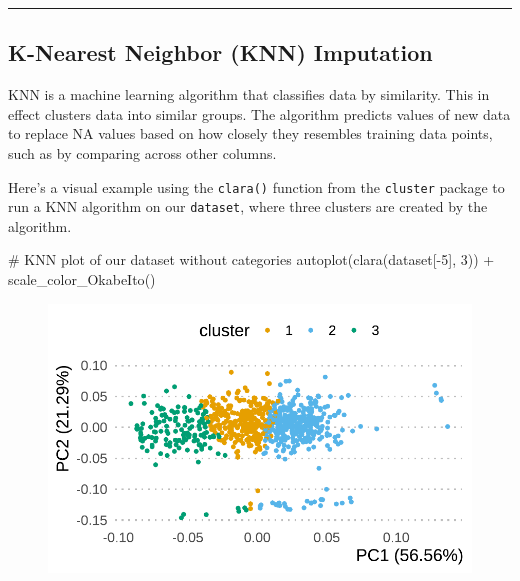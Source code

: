 \documentclass[
  letterpaper,
  DIV=11,
  numbers=noendperiod]{scrreprt}
\newenvironment{Shaded}{\begin{snugshade}}{\end{snugshade}}
\newcommand{\CommentTok}[1]{\textcolor[rgb]{0.37,0.37,0.37}{#1}}
\newcommand{\DecValTok}[1]{\textcolor[rgb]{0.68,0.00,0.00}{#1}}
\newcommand{\FunctionTok}[1]{\textcolor[rgb]{0.28,0.35,0.67}{#1}}
\newcommand{\NormalTok}[1]{\textcolor[rgb]{0.00,0.23,0.31}{#1}}
\newcommand{\SpecialCharTok}[1]{\textcolor[rgb]{0.37,0.37,0.37}{#1}}
\begin{document}
\begin{center}\rule{0.5\linewidth}{0.5pt}\end{center}

\hypertarget{k-nearest-neighbor-knn-imputation}{%
\subsection{K-Nearest Neighbor (KNN)
Imputation}\label{k-nearest-neighbor-knn-imputation}}

KNN is a machine learning algorithm that classifies data by similarity.
This in effect clusters data into similar groups. The algorithm predicts
values of new data to replace NA values based on how closely they
resembles training data points, such as by comparing across other
columns.

Here's a visual example using the \texttt{clara()} function from the
\texttt{cluster} package to run a KNN algorithm on our \texttt{dataset},
where three clusters are created by the algorithm.

\begin{Shaded}
\begin{Highlighting}[]
\CommentTok{\# KNN plot of our dataset without categories}
\FunctionTok{autoplot}\NormalTok{(}\FunctionTok{clara}\NormalTok{(dataset[}\SpecialCharTok{{-}}\DecValTok{5}\NormalTok{], }\DecValTok{3}\NormalTok{)) }\SpecialCharTok{+}
  \FunctionTok{scale\_color\_OkabeIto}\NormalTok{()}
\end{Highlighting}
\end{Shaded}

\begin{figure}[H]

{\centering \includegraphics{./ImputatingLikeDataScientist_files/figure-pdf/unnamed-chunk-19-1.pdf}

}

\end{figure}
\end{document}
